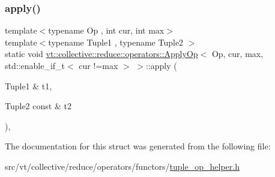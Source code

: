 \subsubsection{\texorpdfstring{apply()}{apply()}}
{\footnotesize\ttfamily template$<$typename Op , int cur, int max$>$ \\
template$<$typename Tuple1 , typename Tuple2 $>$ \\
static void \hyperlink{structvt_1_1collective_1_1reduce_1_1operators_1_1_apply_op}{vt\+::collective\+::reduce\+::operators\+::\+Apply\+Op}$<$ Op, cur, max, std\+::enable\+\_\+if\+\_\+t$<$ cur !=max $>$ $>$\+::apply (\begin{DoxyParamCaption}\item[{Tuple1 \&}]{t1,  }\item[{Tuple2 const \&}]{t2 }\end{DoxyParamCaption})\hspace{0.3cm}{\ttfamily [inline]}, {\ttfamily [static]}}



The documentation for this struct was generated from the following file\+:\begin{DoxyCompactItemize}
\item 
src/vt/collective/reduce/operators/functors/\hyperlink{tuple__op__helper_8h}{tuple\+\_\+op\+\_\+helper.\+h}\end{DoxyCompactItemize}
